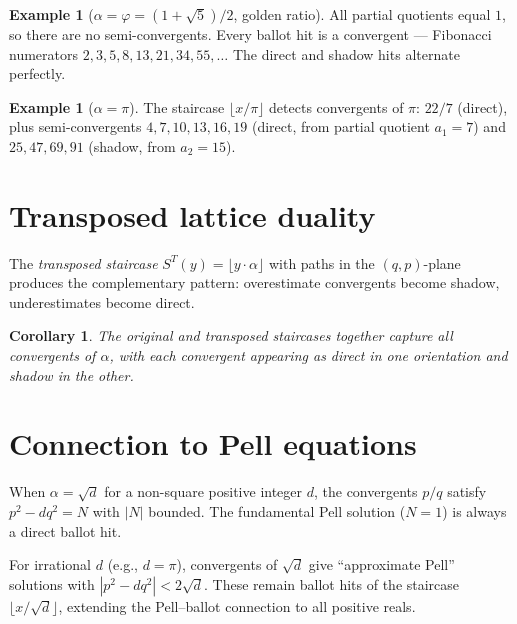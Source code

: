 \documentclass[11pt]{article}
\newtheorem{corollary}[theorem]{Corollary}
\theoremstyle{definition}
\newtheorem{example}[theorem]{Example}
\theoremstyle{remark}
\newcommand{\floor}[1]{\lfloor #1 \rfloor}
\begin{document}
\begin{example}[$\alpha = \varphi = (1+\sqrt{5})/2$, golden ratio]
All partial quotients equal $1$, so there are no semi-convergents.
Every ballot hit is a convergent --- Fibonacci numerators $2, 3, 5, 8, 13, 21, 34, 55, \ldots$
The direct and shadow hits alternate perfectly.
\end{example}

\begin{example}[$\alpha = \pi$]
The staircase $\floor{x/\pi}$ detects convergents of $\pi$: $22/7$ (direct), plus semi-convergents $4, 7, 10, 13, 16, 19$ (direct, from partial quotient $a_1 = 7$) and $25, 47, 69, 91$ (shadow, from $a_2 = 15$).
\end{example}

\section{Transposed lattice duality}

The \emph{transposed staircase} $S^T(y) = \floor{y \cdot \alpha}$ with paths in the $(q, p)$-plane produces the complementary pattern: overestimate convergents become shadow, underestimates become direct.

\begin{corollary}
The original and transposed staircases together capture all convergents of $\alpha$, with each convergent appearing as direct in one orientation and shadow in the other.
\end{corollary}

\section{Connection to Pell equations}

When $\alpha = \sqrt{d}$ for a non-square positive integer $d$, the convergents $p/q$ satisfy $p^2 - dq^2 = N$ with $|N|$ bounded.
The fundamental Pell solution ($N = 1$) is always a direct ballot hit.

For irrational $d$ (e.g., $d = \pi$), convergents of $\sqrt{d}$ give ``approximate Pell'' solutions with $|p^2 - dq^2| < 2\sqrt{d}$.
These remain ballot hits of the staircase $\floor{x/\sqrt{d}}$, extending the Pell--ballot connection to all positive reals.
\end{document}
